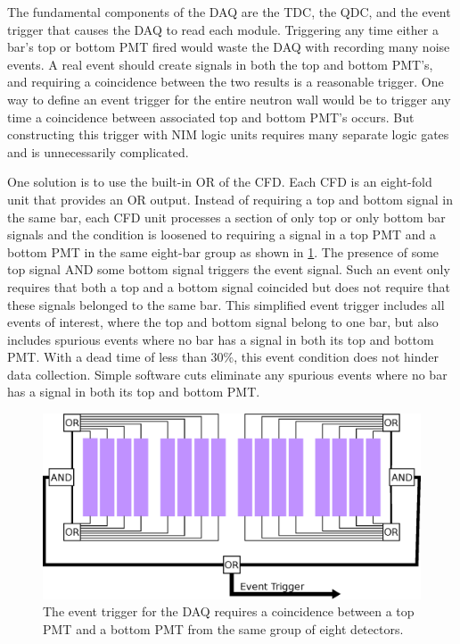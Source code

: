 The fundamental components of the DAQ are the TDC, the QDC, and the event trigger that causes the DAQ to read each module.  Triggering any time either a bar's top or bottom PMT fired would waste the DAQ with recording many noise events.  A real event should create signals in both the top and bottom PMT's, and requiring a coincidence between the two results is a reasonable trigger.  One way to define an event trigger for the entire neutron wall would be to trigger any time a coincidence between associated top and bottom PMT's occurs.  But constructing this trigger with NIM logic units requires many separate logic gates and is unnecessarily complicated.  

One solution is to use the built-in OR of the CFD.  Each CFD is an eight-fold unit that provides an OR output.  Instead of requiring a top and bottom signal in the same bar, each CFD unit processes a section of only top or only bottom bar signals and the condition is loosened to requiring a signal in a top PMT and a bottom PMT in the same eight-bar group as shown in \ref{fig:eventTrig}.  The presence of some top signal AND some bottom signal triggers the event signal.  Such an event only requires that both a top and a bottom signal coincided but does not require that these signals belonged to the same bar.  This simplified event trigger includes all events of interest, where the top and bottom signal belong to one bar, but also includes spurious events where no bar has a signal in both its top and bottom PMT.  With a dead time of less than 30\%, this event condition does not hinder data collection.  Simple software cuts eliminate any spurious events where no bar has a signal in both its top and bottom PMT.

\begin{figure}[htp]
\centering
\includegraphics[width=1.0\textwidth]{figures/event_trigger.eps}
\caption{The event trigger for the DAQ requires a coincidence between a top PMT and a bottom PMT from the same group of eight detectors.}
\label{fig:eventTrig}
\end{figure}

